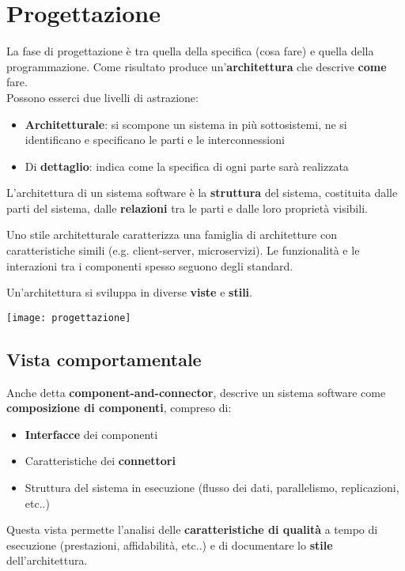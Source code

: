 \newpage
\section{Progettazione}
La fase di progettazione è tra quella della specifica (cosa fare) e quella della programmazione. Come risultato produce un'\textbf{architettura} che descrive \textbf{come} fare.\\
Possono esserci due livelli di astrazione:
\begin{itemize}
	\item \textbf{Architetturale}: si scompone un sistema in più sottosistemi, ne si identificano e specificano le parti e le interconnessioni
	\item Di \textbf{dettaglio}: indica come la specifica di ogni parte sarà realizzata
\end{itemize}

\begin{definition}
	L’architettura di un sistema software è la \textbf{struttura} del sistema, costituita dalle parti del sistema, dalle \textbf{relazioni} tra le parti e dalle loro proprietà visibili.
\end{definition}

\begin{definition}
	Uno stile architetturale caratterizza una famiglia di architetture con caratteristiche simili (e.g. client-server, microservizi). Le funzionalità e le interazioni tra i componenti spesso seguono degli standard.
\end{definition}

Un'architettura si sviluppa in diverse \textbf{viste} e \textbf{stili}.

\begin{center}
	\texttt{[image: progettazione]}
\end{center}

\subsection{Vista comportamentale}
Anche detta \textbf{component-and-connector}, descrive un sistema software come \textbf{composizione di componenti}, compreso di:
\begin{itemize}
	\item \textbf{Interfacce} dei componenti
	\item Caratteristiche dei \textbf{connettori}
	\item Struttura del sistema in esecuzione (flusso dei dati, parallelismo, replicazioni, etc..)
\end{itemize}
Questa vista permette l'analisi delle \textbf{caratteristiche di qualità} a tempo di esecuzione (prestazioni, affidabilità, etc..) e di documentare lo \textbf{stile} dell'architettura.

